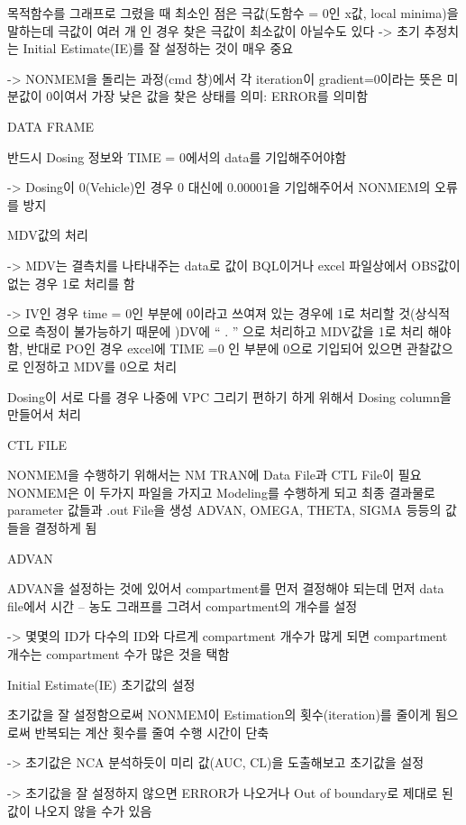 \documentclass[
]{article}
\begin{document}
목적함수를 그래프로 그렸을 때 최소인 점은 극값(도함수 = 0인 x값, local
minima)을 말하는데 극값이 여러 개 인 경우 찾은 극값이 최소값이 아닐수도
있다 -\textgreater{} 초기 추정치는 Initial Estimate(IE)를 잘 설정하는
것이 매우 중요

-\textgreater{} NONMEM을 돌리는 과정(cmd 창)에서 각 iteration이
gradient=0이라는 뜻은 미분값이 0이여서 가장 낮은 값을 찾은 상태를 의미:
ERROR를 의미함

DATA FRAME

반드시 Dosing 정보와 TIME = 0에서의 data를 기입해주어야함

-\textgreater{} Dosing이 0(Vehicle)인 경우 0 대신에 0.00001을
기입해주어서 NONMEM의 오류를 방지

MDV값의 처리

-\textgreater{} MDV는 결측치를 나타내주는 data로 값이 BQL이거나 excel
파일상에서 OBS값이 없는 경우 1로 처리를 함

-\textgreater{} IV인 경우 time = 0인 부분에 0이라고 쓰여져 있는 경우에
1로 처리할 것(상식적으로 측정이 불가능하기 때문에 )DV에 `` . '' 으로
처리하고 MDV값을 1로 처리 해야함, 반대로 PO인 경우 excel에 TIME =0 인
부분에 0으로 기입되어 있으면 관찰값으로 인정하고 MDV를 0으로 처리

Dosing이 서로 다를 경우 나중에 VPC 그리기 편하기 하게 위해서 Dosing
column을 만들어서 처리

CTL FILE

NONMEM을 수행하기 위해서는 NM TRAN에 Data File과 CTL File이 필요
NONMEM은 이 두가지 파일을 가지고 Modeling를 수행하게 되고 최종 결과물로
parameter 값들과 .out File을 생성 ADVAN, OMEGA, THETA, SIGMA 등등의
값들을 결정하게 됨

ADVAN

ADVAN을 설정하는 것에 있어서 compartment를 먼저 결정해야 되는데 먼저
data file에서 시간 -- 농도 그래프를 그려서 compartment의 개수를 설정

-\textgreater{} 몇몇의 ID가 다수의 ID와 다르게 compartment 개수가 많게
되면 compartment 개수는 compartment 수가 많은 것을 택함

Initial Estimate(IE) 초기값의 설정

초기값을 잘 설정함으로써 NONMEM이 Estimation의 횟수(iteration)를 줄이게
됨으로써 반복되는 계산 횟수를 줄여 수행 시간이 단축

-\textgreater{} 초기값은 NCA 분석하듯이 미리 값(AUC, CL)을 도출해보고
초기값을 설정

-\textgreater{} 초기값을 잘 설정하지 않으면 ERROR가 나오거나 Out of
boundary로 제대로 된 값이 나오지 않을 수가 있음
\end{document}
